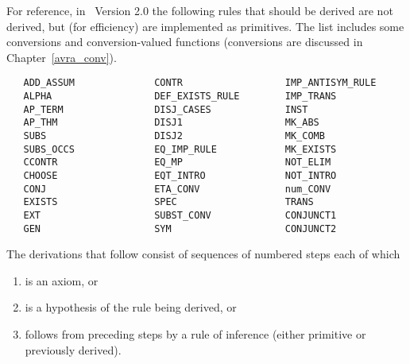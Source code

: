 For reference, in \HOL\ Version 2.0 the following rules that should be
derived are not derived, but (for efficiency) are implemented as primitives. The list includes some conversions and conversion-valued functions (conversions are
discussed in Chapter~\ref{avra_conv}).
\vfill
\newpage

\begin{hol}
\begin{verbatim}
   ADD_ASSUM              CONTR                  IMP_ANTISYM_RULE    
   ALPHA                  DEF_EXISTS_RULE        IMP_TRANS     
   AP_TERM                DISJ_CASES             INST     
   AP_THM                 DISJ1                  MK_ABS     
   SUBS                   DISJ2                  MK_COMB          
   SUBS_OCCS              EQ_IMP_RULE            MK_EXISTS                
   CCONTR                 EQ_MP                  NOT_ELIM     
   CHOOSE                 EQT_INTRO              NOT_INTRO    
   CONJ                   ETA_CONV               num_CONV
   EXISTS                 SPEC                   TRANS       
   EXT                    SUBST_CONV             CONJUNCT1
   GEN                    SYM                    CONJUNCT2
\end{verbatim}\end{hol}

The derivations that follow consist of sequences of numbered steps each of
which
\begin{enumerate}
\item is an axiom, or
\item is a hypothesis of the rule being derived, or
\item follows from preceding steps by a rule of inference (either primitive
or previously derived).
\end{enumerate}

